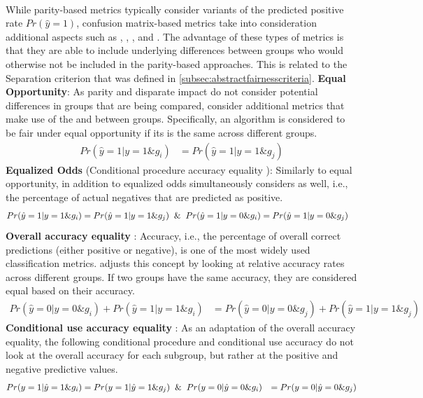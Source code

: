 \hfill\\
While parity-based metrics typically consider variants of the predicted positive rate $Pr(\hat{y}=1)$, confusion matrix-based metrics take into consideration additional aspects such as \tpr, \tnr, \fpr, and \fnr. The advantage of these types of metrics is that they are able to include underlying differences between groups who would otherwise not be included in the parity-based approaches. This is related to the Separation criterion that was defined in \autoref{subsec:abstractfairnesscriteria}.
\textbf{Equal Opportunity}: As parity and disparate impact do not consider potential differences in groups that are being compared,  consider additional metrics that make use of the \fpr and \tpr between groups. Specifically, an algorithm is considered to be fair under equal opportunity if its \tpr is the same across different groups. 
\begin{align}
   Pr(\hat{y}=1 |y=1 \& g_i) &= Pr(\hat{y}=1 | y=1 \& g_j) 
\end{align}
\textbf{Equalized Odds} (Conditional procedure accuracy equality ): Similarly to equal opportunity, in addition to \tpr equalized odds simultaneously considers \fpr as well, i.e., the percentage of actual negatives that are predicted as positive. 
\begin{align}
   Pr(\hat{y}=1 |y=1 \& g_i) = Pr(\hat{y}=1 | y=1 \& g_j) &\And Pr(\hat{y}=1 |y=0 \& g_i) = Pr(\hat{y}=1 | y=0 \& g_j)
\end{align}
\textbf{Overall accuracy equality} : Accuracy, i.e., the percentage of overall correct predictions (either positive or negative), is one of the most widely used classification metrics.  adjusts this concept by looking at relative accuracy rates across different groups. If two groups have the same accuracy, they are considered equal based on their accuracy. 
\begin{align}
   Pr(\hat{y}=0 |y=0 \& g_i) + Pr(\hat{y}=1 |y=1 \& g_i) &= Pr(\hat{y}=0 |y=0 \& g_j) + Pr(\hat{y}=1 |y=1 \& g_j)
\end{align}
\textbf{Conditional use accuracy equality} : As an adaptation of the overall accuracy equality, the following conditional procedure and conditional use accuracy do not look at the overall accuracy for each subgroup, but rather at the positive and negative predictive values. 
\begin{align}
   Pr(y=1 | \hat{y}=1 \& g_i) &= Pr(y=1 | \hat{y}=1 \& g_j) \And 
   Pr(y=0 | \hat{y}=0 \& g_i) &= Pr(y=0 | \hat{y}=0 \& g_j)
\end{align}
